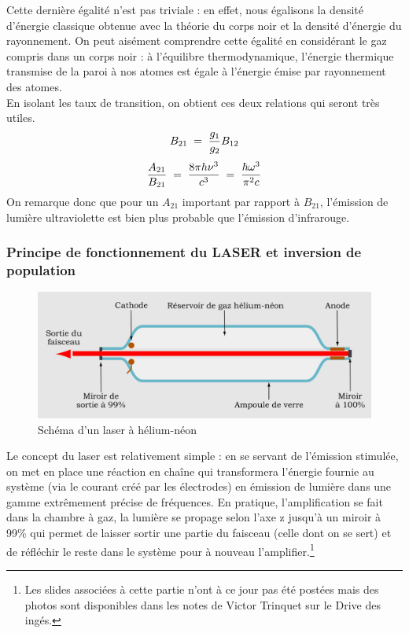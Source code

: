 Cette dernière égalité n'est pas triviale : en effet, nous égalisons la densité d'énergie classique obtenue avec la théorie du corps noir et la densité d'énergie du rayonnement. On peut aisément comprendre cette égalité en considérant le gaz compris dans un corps noir : à l'équilibre thermodynamique, l'énergie thermique transmise de la paroi à nos atomes est égale à l'énergie émise par rayonnement des atomes.\\
En isolant les taux de transition, on obtient ces deux relations qui seront très utiles.
\begin{equation}
    B_{21} \; = \; \dfrac{g_1}{g_2}B_{12}
    \label{eq:equilire1}
\end{equation}
\begin{equation}
    \dfrac{A_{21}}{B_{21}} 
    \; = \; \dfrac{8\pi h \nu^3}{c^3}
    \; = \; \dfrac{\hbar \omega^3}{\pi^2c}
    \label{eq:equilire2}
\end{equation}
On remarque donc que pour un $A_{21}$ important par rapport à $B_{21}$, l'émission de lumière ultraviolette est bien plus probable que l'émission d'infrarouge.


\subsubsection{Principe de fonctionnement du LASER et inversion de population}



\begin{figure}[tph]
    \centering
    \includegraphics[scale=0.7]{Images2/Laser.png}
    \caption{Schéma d'un laser à hélium-néon}
    \label{fig:Laser}
\end{figure}
Le concept du laser est relativement simple : en se servant de l'émission stimulée, on met en place une réaction en chaîne qui transformera l'énergie fournie au système (via le courant créé par les électrodes) en émission de lumière dans une gamme extrêmement précise de fréquences. En pratique, l'amplification se fait dans la chambre à gaz, la lumière se propage selon l'axe z jusqu'à un miroir à 99\% qui permet de laisser sortir une partie du faisceau (celle dont on se sert) et de réfléchir le reste dans le système pour à nouveau l'amplifier.\footnote{Les slides associées à cette partie n'ont à ce jour pas été postées mais des photos sont disponibles dans les notes de Victor Trinquet sur le Drive des ingés.}\\

